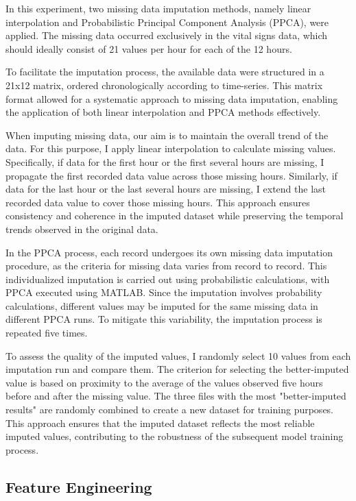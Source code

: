 \documentclass[12pt,a4paper,english
]{tunithesis}
\begin{document}
In this experiment, two missing data imputation methods, namely linear interpolation and Probabilistic Principal Component Analysis (PPCA), were applied. The missing data occurred exclusively in the vital signs data, which should ideally consist of 21 values per hour for each of the 12 hours.

To facilitate the imputation process, the available data were structured in a 21x12 matrix, ordered chronologically according to time-series. This matrix format allowed for a systematic approach to missing data imputation, enabling the application of both linear interpolation and PPCA methods effectively.

When imputing missing data, our aim is to maintain the overall trend of the data. For this purpose, I apply linear interpolation to calculate missing values. Specifically, if data for the first hour or the first several hours are missing, I propagate the first recorded data value across those missing hours. Similarly, if data for the last hour or the last several hours are missing, I extend the last recorded data value to cover those missing hours. This approach ensures consistency and coherence in the imputed dataset while preserving the temporal trends observed in the original data.

In the PPCA process, each record undergoes its own missing data imputation procedure, as the criteria for missing data varies from record to record. This individualized imputation is carried out using probabilistic calculations, with PPCA executed using MATLAB. Since the imputation involves probability calculations, different values may be imputed for the same missing data in different PPCA runs. To mitigate this variability, the imputation process is repeated five times.

To assess the quality of the imputed values, I randomly select 10 values from each imputation run and compare them. The criterion for selecting the better-imputed value is based on proximity to the average of the values observed five hours before and after the missing value. The three files with the most "better-imputed results" are randomly combined to create a new dataset for training purposes. This approach ensures that the imputed dataset reflects the most reliable imputed values, contributing to the robustness of the subsequent model training process.


\subsection{Feature Engineering}
\end{document}
